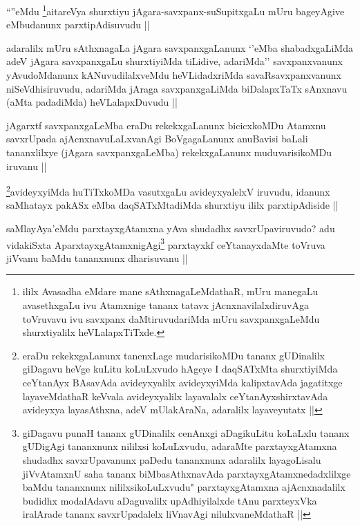 \newpage


\begin{artha}
``\stext''eMdu \footnote{ililx Avasadha eMdare mane sAthxnagaLeMdathaR, mUru manegaLu avasethxgaLu ivu Atamxnige tananx tatavx jAcnxnavilalxdiruvAga toVruvavu ivu savxpanx daMtiruvudariMda mUru savxpanxgaLeMdu shurxtiyalilx heVLalapxTiTxde.}aitareVya shurxtiyu jAgara-savxpanx-suSupitxgaLu mUru bageyAgive eMbudanunx parxtipAdisuvudu ||
\end{artha}


\begin{artha}
adaralilx mUru sAthxnagaLa jAgara savxpanxgaLanunx `\stext'eMba shabadxgaLiMda adeV jAgara savxpanxgaLu shurxtiyiMda tiLidive, adariMda'' savxpanxvanunx yAvudoMdanunx kANuvudilalxveMdu heVLidadxriMda savaRsavxpanxvanunx niSeVdhisiruvudu, adariMda jAraga savxpanxgaLiMda biDalapxTaTx sAnxnavu (aMta padadiMda) heVLalapxDuvudu ||
\end{artha}


\begin{artha}
jAgarxtf savxpanxgaLeMba eraDu rekekxgaLanunx bicicxkoMDu Atamxnu savxrUpada ajAcnxnavuLaLxvanAgi BoVgagaLanunx anuBavisi baLali tananxlilxye (jAgara savxpanxgaLeMba) rekekxgaLanunx muduvarisikoMDu iruvanu ||
\end{artha}


\begin{artha}
\footnote{eraDu rekekxgaLanunx tanenxLage mudarisikoMDu tananx gUDinalilx giDagavu heVge kuLitu koLuLxvudo hAgeye I daqSATxMta shurxtiyiMda ceYtanAyx BAsavAda avideyxyalilx avideyxyiMda kalipxtavAda jagatitxge layaveMdathaR keVvala avideyxyalilx layavalalx ceYtanAyxshirxtavAda avideyxya layasAthxna, adeV mUlakAraNa, adaralilx layaveyutatx ||}avideyxyiMda huTiTxkoMDa vasutxgaLu avideyxyalelxV iruvudu, idanunx saMhatayx pakASx eMba daqSATxMtadiMda shurxtiyu ililx parxtipAdiside ||
\end{artha}


\begin{artha}
saMlayAya'eMdu parxtayxgAtamxna yAva shudadhx savxrUpaviruvudo? adu vidakiSxta AparxtayxgAtamxnigAgi\footnote{giDagavu punaH tananx gUDinalilx cenAnxgi aDagikuLitu koLaLxlu tananx gUDigAgi tananxnunx nililxsi koLuLxvudu, adaraMte parxtayxgAtamxna shudadhx savxrUpavanunx paDedu tananxnunx adaralilx layagoLisalu jiVvAtamxnU saha tananx biMbasAthxnavAda parxtayxgAtamxnedadxlilxge baMdu tananxnunx nililxsikoLuLxvudu" parxtayxgAtamxna ajAcnxnadalilx budidhx modalAdavu aDaguvalilx upAdhiyilalxde tAnu parxteyxVka iralArade tananx savxrUpadalelx liVnavAgi nilulxvaneMdathaR ||} parxtayxkf ceYtanayxdaMte toVruva jiVvanu baMdu tananxnunx dharisuvanu ||
\end{artha}

